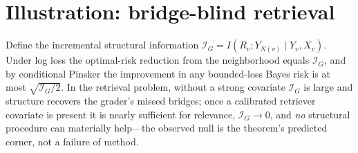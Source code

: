 \documentclass[11pt]{article}
\theoremstyle{plain}
\theoremstyle{definition}\newtheorem{definition}{Definition}\newtheorem{assumption}{Assumption}
\begin{document}
\section{Illustration: bridge-blind retrieval}\label{sec:illus}
Define the incremental structural information $\mathcal I_G=I(R_v;Y_{N(v)}\mid Y_v,X_v)$. Under log loss the
optimal-risk reduction from the neighborhood equals $\mathcal I_G$, and by conditional Pinsker the improvement in
any bounded-loss Bayes risk is at most $\sqrt{\mathcal I_G/2}$. In the retrieval problem, without a strong
covariate $\mathcal I_G$ is large and structure recovers the grader's missed bridges; once a calibrated retriever
covariate is present it is nearly sufficient for relevance, $\mathcal I_G\!\to\!0$, and \emph{no} structural
procedure can materially help---the observed null is the theorem's predicted corner, not a failure of method.
\end{document}
